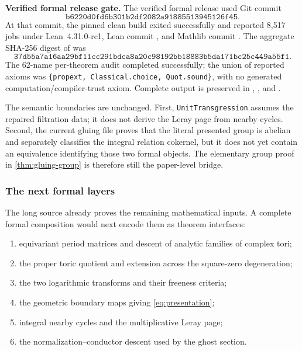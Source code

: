 \documentclass[11pt,reqno]{amsart}
\numberwithin{equation}{section}
\theoremstyle{definition}
\begin{document}
\textbf{Verified formal release gate.}
The verified formal release used Git commit
\[
\texttt{b6220d0fd6b301b2df2082a91885513945126f45}.
\]
At that commit, the pinned clean build exited successfully and reported 8,517 jobs under Lean~4.31.0-rc1, Lean commit , and Mathlib commit . The aggregate SHA-256 digest of  was
\[
\texttt{37d55a7a16aa29bf11cc291bdca8a20c98192bb18883b5da171bc25c449a55f1}.
\]
The 62-name per-theorem audit completed successfully; the union of reported axioms was \texttt{\{propext, Classical.choice, Quot.sound\}}, with no generated computation/compiler-trust axiom. Complete output is preserved in , , and .

The semantic boundaries are unchanged. First, \texttt{UnitTransgression} assumes the repaired filtration data; it does not derive the Leray page from nearby cycles. Second, the current gluing file proves that the literal presented group is abelian and separately classifies the integral relation cokernel, but it does not yet contain an equivalence identifying those two formal objects. The elementary group proof in \cref{thm:gluing-group} is therefore still the paper-level bridge.

\subsubsection{The next formal layers}

The long source already proves the remaining mathematical inputs. A complete formal composition would next encode them as theorem interfaces:
\begin{enumerate}
\item equivariant period matrices and descent of analytic families of complex tori;
\item the proper toric quotient and extension across the square-zero degeneration;
\item the two logarithmic transforms and their freeness criteria;
\item the geometric boundary maps giving \cref{eq:presentation};
\item integral nearby cycles and the multiplicative Leray page;
\item the normalization--conductor descent used by the ghost section.
\end{enumerate}
\end{document}
